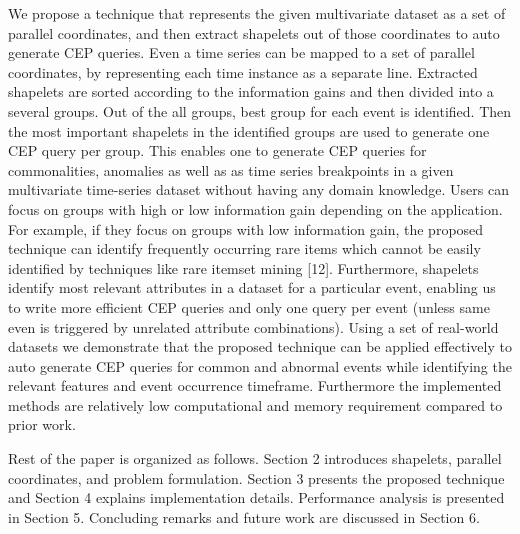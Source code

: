 \documentclass[letterpaper, 10 pt, conference]{IEEEtran}  %
\begin{document}
We propose a technique that represents the given multivariate dataset as a set of parallel coordinates, and then extract shapelets out of those coordinates to auto generate CEP queries. Even a time series can be mapped to a set of parallel coordinates, by representing each time instance as a separate line. Extracted shapelets are sorted according to the information gains and then divided into a several groups. Out of the all groups, best group for each event is identified. Then the most important shapelets in the identified groups are used to generate one CEP query per group. This enables one to generate CEP queries for commonalities, anomalies as well as as time series breakpoints in a given multivariate time-series dataset without having any domain knowledge. Users can focus on groups with high or low information gain depending on the application. For example, if they focus on groups with low information gain, the proposed technique can identify frequently occurring rare items which cannot be easily identified by techniques like rare itemset mining [12]. Furthermore, shapelets identify most relevant attributes in a dataset for a particular event, enabling us to write more efficient CEP queries and only one query per event (unless same even is triggered by unrelated attribute combinations). Using a set of real-world datasets we demonstrate that the proposed technique can be applied effectively to auto generate CEP queries for common and abnormal events while identifying the relevant features and event occurrence timeframe. Furthermore the implemented methods are relatively low computational and memory requirement compared to prior work.

Rest of the paper is organized as follows. Section 2 introduces shapelets, parallel coordinates, and problem formulation. Section 3 presents the proposed technique and Section 4 explains implementation details. Performance analysis is presented in Section 5. Concluding remarks and future work are discussed in Section 6.
\end{document}
